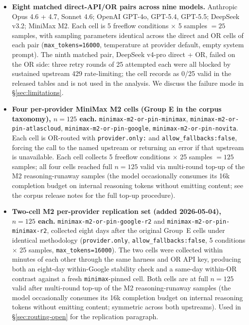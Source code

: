 \documentclass[11pt,a4paper]{article}
\begin{document}
\begin{itemize}[leftmargin=2em, itemsep=0.3em]
    \item \textbf{Eight matched direct-API/OR pairs across nine models.} Anthropic Opus 4.6 + 4.7, Sonnet 4.6; OpenAI GPT-4o, GPT-5.4, GPT-5.5; DeepSeek v3.2; MiniMax M2. Each cell is 5 freeflow conditions $\times$ 5 samples $= 25$ samples, with sampling parameters identical across the direct and OR cells of each pair (\texttt{max\_tokens=16000}, temperature at provider default, empty system prompt). The ninth matched pair, DeepSeek v4-pro direct + OR, failed on the OR side: three retry rounds of 25 attempted each were all blocked by sustained upstream 429 rate-limiting; the cell records as 0/25 valid in the released tables and is not used in the analysis. We discuss the failure mode in \S\ref{sec:limitations}.

    \item \begin{sloppypar}\textbf{Four per-provider MiniMax M2 cells (Group E in the corpus taxonomy), $n{=}125$ each.} \texttt{minimax-m2-\allowbreak or-pin-\allowbreak minimax}, \texttt{minimax-m2-\allowbreak or-pin-\allowbreak atlascloud}, \texttt{minimax-m2-\allowbreak or-pin-\allowbreak google}, \texttt{minimax-m2-\allowbreak or-pin-\allowbreak novita}. Each cell is OR-routed with \texttt{provider.only:\allowbreak[<provider>]} and \texttt{allow\_fallbacks:\allowbreak false}, forcing the call to the named upstream or returning an error if that upstream is unavailable. Each cell collects 5 freeflow conditions $\times$ 25 samples $= 125$ samples; all four cells reached full $n{=}125$ valid via multi-round top-up of the M2 reasoning-runaway samples (the model occasionally consumes its 16k completion budget on internal reasoning tokens without emitting content; see the corpus release notes for the full top-up procedure).\end{sloppypar}

    \item \begin{sloppypar}\textbf{Two-cell M2 per-provider replication set (added 2026-05-04), $n{=}125$ each.} \texttt{minimax-m2-\allowbreak or-pin-\allowbreak google-r2} and \texttt{minimax-m2-\allowbreak or-pin-\allowbreak minimax-r2}, collected eight days after the original Group~E cells under identical methodology (\texttt{provider.only}, \texttt{allow\_fallbacks:\allowbreak false}, 5 conditions $\times$ 25 samples, \texttt{max\_tokens=16000}). The two cells were collected within minutes of each other through the same harness and OR API key, producing both an eight-day within-Google stability check and a same-day within-OR contrast against a fresh \texttt{minimax}-pinned cell. Both cells are at full $n{=}125$ valid after multi-round top-up of the M2 reasoning-runaway samples (the model occasionally consumes its 16k completion budget on internal reasoning tokens without emitting content; symmetric across both upstreams). Used in \S\ref{sec:routing-open} for the replication paragraph.\end{sloppypar}


\end{itemize}
\end{document}
